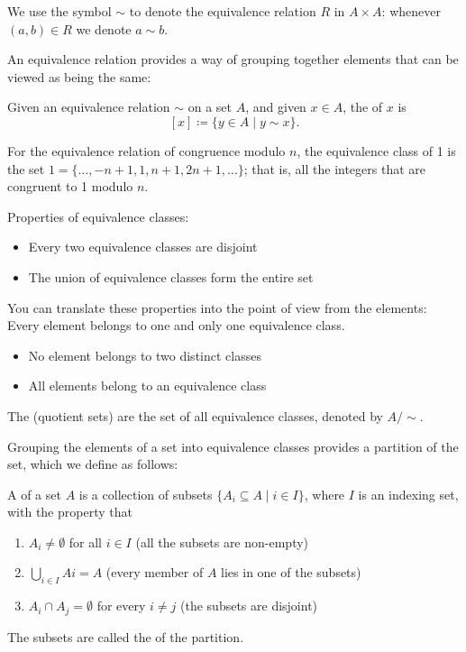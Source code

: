 \begin{notation}
We use the symbol $\sim$ to denote the equivalence relation $R$ in $A \times A$: whenever $(a,b)\in R$ we denote $a \sim b$.
\end{notation}

An equivalence relation provides a way of grouping together elements that can be viewed as being the same:

\begin{definition}
Given an equivalence relation $\sim$ on a set $A$, and given $x \in A$, the  of $x$ is
\[[x]\coloneqq\{y\in A\mid y\sim x\}.\]
\end{definition}

\begin{example}
For the equivalence relation of congruence modulo $n$, the equivalence class of 1 is the set $1 = \{\dots, -n+1, 1, n+1, 2n+1, \dots\}$; that is, all the integers that are congruent to 1 modulo $n$.
\end{example}

Properties of equivalence classes:
\begin{itemize}
\item Every two equivalence classes are disjoint
\item The union of equivalence classes form the entire set
\end{itemize}

You can translate these properties into the point of view from the elements: Every element belongs to one and only one equivalence class.
\begin{itemize}
\item No element belongs to two distinct classes
\item All elements belong to an equivalence class
\end{itemize}

\begin{definition}
The  (quotient sets) are the set of all equivalence classes, denoted by $A/\sim$.
\end{definition}

Grouping the elements of a set into equivalence classes provides a partition of the set, which we define as follows:

\begin{definition}[Partition]
A  of a set $A$ is a collection of subsets $\{A_i\subseteq A\mid i\in I\}$, where $I$ is an indexing set, with the property that
\begin{enumerate}[label=(\roman*)]
\item $A_i \neq \emptyset$ for all $i \in I$ (all the subsets are non-empty)
\item $\bigcup_{i\in I} Ai = A$ (every member of $A$ lies in one of the subsets)
\item $A_i \cap A_j = \emptyset$ for every $i \neq j$ (the subsets are disjoint)
\end{enumerate}
The subsets are called the  of the partition.
\end{definition}

